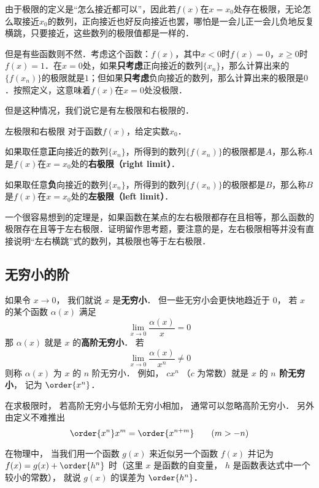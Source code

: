 由于极限的定义是“怎么接近都可以”，因此若$f(x)$在$x=x_0$处存在极限，无论怎么取接近$x_0$的数列，正向接近也好反向接近也罢，哪怕是一会儿正一会儿负地反复横跳，只要接近，这些数列的极限值都是一样的．

但是有些函数则不然．考虑这个函数：$f(x)$，其中$x<0$时$f(x)=0$，$x\geq 0$时$f(x)=1$．在$x=0$处，如果\textbf{只考虑}正向接近的数列$\{x_n\}$，那么计算出来的$\{f(x_n)\}$的极限就是$1$；但如果\textbf{只考虑}负向接近的数列，那么计算出来的极限是$0$．按照定义，这意味着$f(x)$在$x=0$处没极限．

但是这种情况，我们说它是有左极限和右极限的．

\begin{definition}{左极限和右极限}
对于函数$f(x)$，给定实数$x_0$．

如果取任意\textbf{正}向接近的数列$\{x_n\}$，所得到的数列$\{f(x_n)\}$的极限都是$A$，那么称$A$是$f(x)$在$x=x_0$处的\textbf{右极限（right limit）}．

如果取任意\textbf{负}向接近的数列$\{x_n\}$，所得到的数列$\{f(x_n)\}$的极限都是$B$，那么称$B$是$f(x)$在$x=x_0$处的\textbf{左极限（left limit）}．
\end{definition}

一个很容易想到的定理是，如果函数在某点的左右极限都存在且相等，那么函数的极限存在且等于左右极限．证明留作思考题，要注意的是，左右极限相等并没有直接说明“左右横跳”式的数列，其极限也等于左右极限．





\subsection{无穷小的阶}
如果令 $x\to 0$， 我们就说 $x$ 是\textbf{无穷小}． 但一些无穷小会更快地趋近于 $0$， 若 $x$ 的某个函数 $\alpha(x)$ 满足
\begin{equation}
\lim_{x\to 0} \frac{\alpha(x)}{x} = 0
\end{equation}
那 $\alpha(x)$ 就是 $x$ 的\textbf{高阶无穷小}． 若
\begin{equation}
\lim_{x\to 0} \frac{\alpha(x)}{x^n} \ne 0
\end{equation}
则称 $\alpha(x)$ 为 $x$ 的 $n$ 阶无穷小． 例如， $c x^n$ （$c$ 为常数）就是 $x$ 的 \textbf{$n$ 阶无穷小}， 记为 $\order{x^n}$．

在求极限时， 若高阶无穷小与低阶无穷小相加， 通常可以忽略高阶无穷小． 另外由定义不难推出
\begin{equation}
\order{x^n} x^m = \order{x^{n + m}} \qquad (m > -n)
\end{equation}

在物理中， 当我们用一个函数 $g(x)$ 来近似另一个函数 $f(x)$ 并记为 $f(x) = g(x) + \order{h^n}$ 时（这里 $x$ 是函数的自变量， $h$ 是函数表达式中一个较小的常数）， 就说 $g(x)$ 的误差为 $\order{h^n}$．
